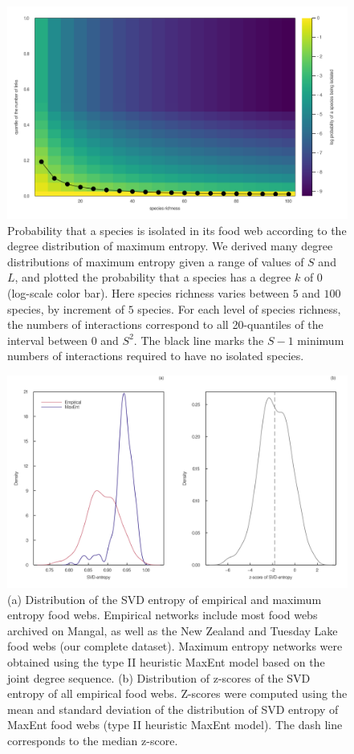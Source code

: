 \documentclass[
  12pt,
]{article}
\begin{document}
\begin{figure}
\hypertarget{fig:heatmap}{%
\centering
\includegraphics{figures/heatmap_disconnected.png}
\caption{Probability that a species is isolated in its food web
according to the degree distribution of maximum entropy. We derived many
degree distributions of maximum entropy given a range of values of \(S\)
and \(L\), and plotted the probability that a species has a degree \(k\)
of \(0\) (log-scale color bar). Here species richness varies between
\(5\) and \(100\) species, by increment of \(5\) species. For each level
of species richness, the numbers of interactions correspond to all
20-quantiles of the interval between \(0\) and \(S^2\). The black line
marks the \(S-1\) minimum numbers of interactions required to have no
isolated species.}\label{fig:heatmap}
}
\end{figure}

\begin{figure}
\hypertarget{fig:entropy_dist}{%
\centering
\includegraphics{figures/entropy_distribution.png}
\caption{(a) Distribution of the SVD entropy of empirical and maximum
entropy food webs. Empirical networks include most food webs archived on
Mangal, as well as the New Zealand and Tuesday Lake food webs (our
complete dataset). Maximum entropy networks were obtained using the type
II heuristic MaxEnt model based on the joint degree sequence. (b)
Distribution of z-scores of the SVD entropy of all empirical food webs.
Z-scores were computed using the mean and standard deviation of the
distribution of SVD entropy of MaxEnt food webs (type II heuristic
MaxEnt model). The dash line corresponds to the median
z-score.}\label{fig:entropy_dist}
}
\end{figure}
\end{document}
